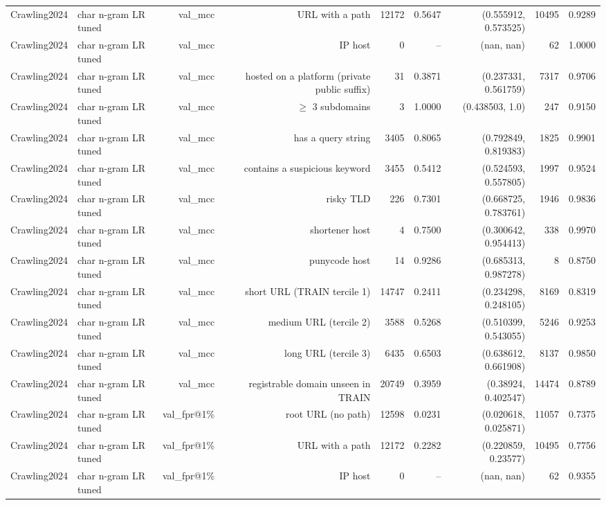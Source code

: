 \begin{table}[t]
\begin{tabular}{llrrrrrrr}
Crawling2024 & char n-gram LR tuned & val\_mcc & URL with a path & 12172 & 0.5647 & (0.555912, 0.573525) & 10495 & 0.9289 \\
Crawling2024 & char n-gram LR tuned & val\_mcc & IP host & 0 & -- & (nan, nan) & 62 & 1.0000 \\
Crawling2024 & char n-gram LR tuned & val\_mcc & hosted on a platform (private public suffix) & 31 & 0.3871 & (0.237331, 0.561759) & 7317 & 0.9706 \\
Crawling2024 & char n-gram LR tuned & val\_mcc & $\geq$ 3 subdomains & 3 & 1.0000 & (0.438503, 1.0) & 247 & 0.9150 \\
Crawling2024 & char n-gram LR tuned & val\_mcc & has a query string & 3405 & 0.8065 & (0.792849, 0.819383) & 1825 & 0.9901 \\
Crawling2024 & char n-gram LR tuned & val\_mcc & contains a suspicious keyword & 3455 & 0.5412 & (0.524593, 0.557805) & 1997 & 0.9524 \\
Crawling2024 & char n-gram LR tuned & val\_mcc & risky TLD & 226 & 0.7301 & (0.668725, 0.783761) & 1946 & 0.9836 \\
Crawling2024 & char n-gram LR tuned & val\_mcc & shortener host & 4 & 0.7500 & (0.300642, 0.954413) & 338 & 0.9970 \\
Crawling2024 & char n-gram LR tuned & val\_mcc & punycode host & 14 & 0.9286 & (0.685313, 0.987278) & 8 & 0.8750 \\
Crawling2024 & char n-gram LR tuned & val\_mcc & short URL (TRAIN tercile 1) & 14747 & 0.2411 & (0.234298, 0.248105) & 8169 & 0.8319 \\
Crawling2024 & char n-gram LR tuned & val\_mcc & medium URL (tercile 2) & 3588 & 0.5268 & (0.510399, 0.543055) & 5246 & 0.9253 \\
Crawling2024 & char n-gram LR tuned & val\_mcc & long URL (tercile 3) & 6435 & 0.6503 & (0.638612, 0.661908) & 8137 & 0.9850 \\
Crawling2024 & char n-gram LR tuned & val\_mcc & registrable domain unseen in TRAIN & 20749 & 0.3959 & (0.38924, 0.402547) & 14474 & 0.8789 \\
Crawling2024 & char n-gram LR tuned & val\_fpr@1\% & root URL (no path) & 12598 & 0.0231 & (0.020618, 0.025871) & 11057 & 0.7375 \\
Crawling2024 & char n-gram LR tuned & val\_fpr@1\% & URL with a path & 12172 & 0.2282 & (0.220859, 0.23577) & 10495 & 0.7756 \\
Crawling2024 & char n-gram LR tuned & val\_fpr@1\% & IP host & 0 & -- & (nan, nan) & 62 & 0.9355 \\

\end{tabular}
\end{table}
